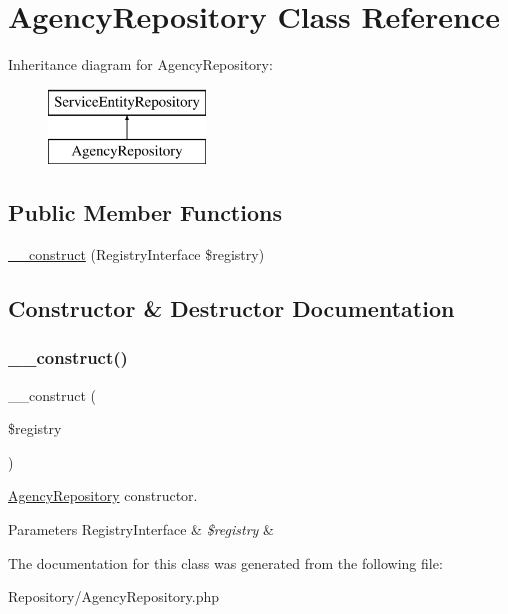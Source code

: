 \hypertarget{class_app_1_1_repository_1_1_agency_repository}{}\section{Agency\+Repository Class Reference}
\label{class_app_1_1_repository_1_1_agency_repository}
Inheritance diagram for Agency\+Repository\+:\begin{figure}[H]
\begin{center}
\leavevmode
\includegraphics[height=2.000000cm]{class_app_1_1_repository_1_1_agency_repository}
\end{center}
\end{figure}
\subsection*{Public Member Functions}
\begin{DoxyCompactItemize}
\item 
\mbox{\hyperlink{class_app_1_1_repository_1_1_agency_repository_aadca7edd263e228921a1860bb6b9c252}{\+\_\+\+\_\+construct}} (Registry\+Interface \$registry)
\end{DoxyCompactItemize}


\subsection{Constructor \& Destructor Documentation}
\mbox{\label{class_app_1_1_repository_1_1_agency_repository_aadca7edd263e228921a1860bb6b9c252}} 
\subsubsection{\texorpdfstring{\_\_construct()}{\_\_construct()}}
{\footnotesize\ttfamily \+\_\+\+\_\+construct (\begin{DoxyParamCaption}\item[{Registry\+Interface}]{\$registry }\end{DoxyParamCaption})}

\mbox{\hyperlink{class_app_1_1_repository_1_1_agency_repository}{Agency\+Repository}} constructor. 
\begin{DoxyParams}[1]{Parameters}
Registry\+Interface & {\em \$registry} & \\
\hline
\end{DoxyParams}


The documentation for this class was generated from the following file\+:\begin{DoxyCompactItemize}
\item 
Repository/Agency\+Repository.\+php\end{DoxyCompactItemize}
